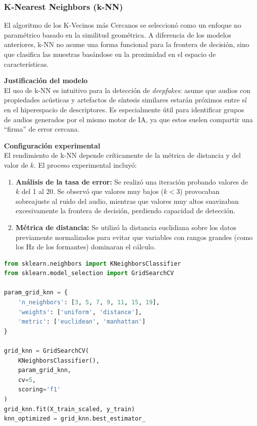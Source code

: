 \subsubsection{K-Nearest Neighbors (k-NN)}

El algoritmo de los K-Vecinos más Cercanos se seleccionó como un enfoque no paramétrico basado en la similitud geométrica. A diferencia de los modelos anteriores, k-NN no asume una forma funcional para la frontera de decisión, sino que clasifica las muestras basándose en la proximidad en el espacio de características.

\textbf{Justificación del modelo} \\
El uso de k-NN es intuitivo para la detección de \textit{deepfakes}: asume que audios con propiedades acústicas y artefactos de síntesis similares estarán próximos entre sí en el hiperespacio de descriptores. Es especialmente útil para identificar grupos de audios generados por el mismo motor de IA, ya que estos suelen compartir una ``firma'' de error cercana.

\textbf{Configuración experimental} \\
El rendimiento de k-NN depende críticamente de la métrica de distancia y del valor de $k$. El proceso experimental incluyó:

\begin{enumerate}
    \item \textbf{Análisis de la tasa de error:} Se realizó una iteración probando valores de $k$ del 1 al 20. Se observó que valores muy bajos ($k < 3$) provocaban sobreajuste al ruido del audio, mientras que valores muy altos suavizaban excesivamente la frontera de decisión, perdiendo capacidad de detección.
    \item \textbf{Métrica de distancia:} Se utilizó la distancia euclidiana sobre los datos previamente normalizados para evitar que variables con rangos grandes (como los Hz de los formantes) dominaran el cálculo.
\end{enumerate}

\begin{lstlisting}[language=Python, caption={Optimización de hiperparámetros para k-NN}]
from sklearn.neighbors import KNeighborsClassifier
from sklearn.model_selection import GridSearchCV

param_grid_knn = {
    'n_neighbors': [3, 5, 7, 9, 11, 15, 19],
    'weights': ['uniform', 'distance'],
    'metric': ['euclidean', 'manhattan']
}

grid_knn = GridSearchCV(
    KNeighborsClassifier(),
    param_grid_knn,
    cv=5,
    scoring='f1'
)
grid_knn.fit(X_train_scaled, y_train)
knn_optimized = grid_knn.best_estimator_
\end{lstlisting}

